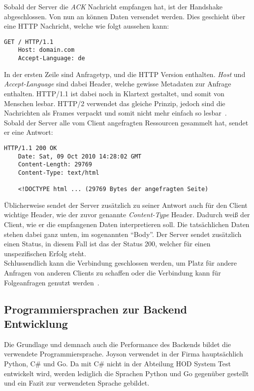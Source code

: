 Sobald der Server die \textit{ACK} Nachricht empfangen hat, ist der Handshake
abgeschlossen. Von nun an können Daten versendet werden. Dies geschieht über
eine HTTP Nachricht, welche wie folgt aussehen kann:\\

\begin{lstlisting}[caption=Beispielhafte HTTP Anfrage]
    GET / HTTP/1.1
    Host: domain.com
    Accept-Language: de
\end{lstlisting}

In der ersten Zeile sind Anfragetyp, und die HTTP Version enthalten. \textit{Host}
und \textit{Accept-Language} sind dabei Header, welche gewisse Metadaten zur 
Anfrage enthalten. HTTP/1.1 ist dabei noch in Klartext gestaltet, und somit 
von Menschen lesbar. HTTP/2 verwendet das gleiche Prinzip, jedoch sind die 
Nachrichten als Frames verpackt und somit nicht mehr einfach so lesbar~\cite{Moz21}. \\

Sobald der Server alle vom Client angefragten Ressourcen gesammelt hat, 
sendet er eine Antwort:\\

\begin{lstlisting}[caption=Beispielhafte HTTP Antwort]
    HTTP/1.1 200 OK
    Date: Sat, 09 Oct 2010 14:28:02 GMT
    Content-Length: 29769
    Content-Type: text/html
    
    <!DOCTYPE html ... (29769 Bytes der angefragten Seite)
\end{lstlisting}

Üblicherweise sendet der Server zusätzlich zu seiner Antwort auch für den Client wichtige Header,
wie der zuvor genannte \textit{Content-Type} Header. Dadurch weiß der Client,
wie er die empfangenen Daten interpretieren soll. Die tatsächlichen Daten stehen
dabei ganz unten, im sogenannten ``Body''. Der Server sendet zusätzlich einen Status,
in diesem Fall ist das der Status 200, welcher für einen unspezifischen Erfolg
steht. \\

Schlussendlich kann die Verbindung geschlossen werden, um Platz für andere Anfragen
von anderen Clients zu schaffen oder die Verbindung kann für Folgeanfragen genutzt
werden~\cite{http02}.


\subsection{Programmiersprachen zur Backend Entwicklung}
Die Grundlage und demnach auch die Performance des Backends bildet die 
verwendete Programmiersprache. Joyson verwendet in der Firma hauptsächlich 
Python, C\# und Go. Da mit C\# nicht in der Abteilung 
\gls{HOD} System Test entwickelt wird, werden lediglich die 
Sprachen Python und Go gegenüber gestellt und ein Fazit zur verwendeten Sprache 
gebildet. \\

